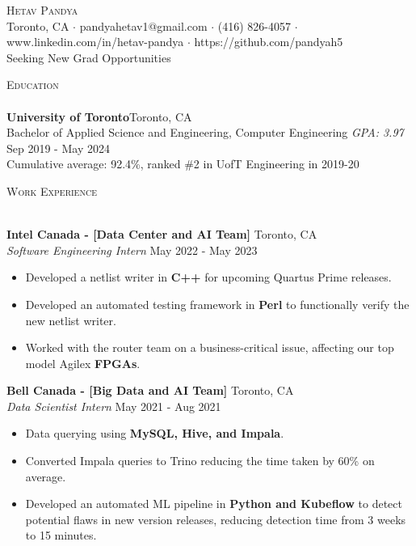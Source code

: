 \documentclass[a4paper]{article}
\newcommand{\lineunder} {
    \vspace*{-8pt} \\
    \hspace*{-18pt} \hrulefill \\
}
\newcommand{\header} [1] {
    {\hspace*{-18pt}\vspace*{6pt} \textsc{#1}}
    \vspace*{-6pt} \lineunder
}
\begin{document}
\vspace*{-40pt}



\vspace*{-10pt}
\begin{center}
	{\Huge \scshape {Hetav Pandya}}\\
	Toronto, CA $\cdot$ pandyahetav1@gmail.com $\cdot$ (416) 826-4057 $\cdot$ www.linkedin.com/in/hetav-pandya $\cdot$ https://github.com/pandyah5\\
    Seeking New Grad Opportunities
\end{center}

\header{Education}
\textbf{University of Toronto}\hfill Toronto, CA\\
Bachelor of Applied Science and Engineering, Computer Engineering \textit{GPA: 3.97} \hfill Sep 2019 - May 2024\\
Cumulative average: 92.4\%, ranked \#2 in UofT Engineering in 2019-20
\vspace{2mm}

\header{Work Experience}
\vspace{1mm}

\textbf{Intel Canada - [Data Center and AI Team]} \hfill Toronto, CA\\
\textit{Software Engineering Intern} \hfill May 2022 - May 2023\\
\vspace{-1mm}
\begin{itemize} \itemsep 1pt
	\item Developed a netlist writer in \textbf{C++} for upcoming Quartus Prime releases.
	\item Developed an automated testing framework in \textbf{Perl} to functionally verify the new netlist writer.
	\item Worked with the router team on a business-critical issue, affecting our top model Agilex \textbf{FPGAs}. 
\end{itemize}

\textbf{Bell Canada - [Big Data and AI Team]} \hfill Toronto, CA\\
\textit{Data Scientist Intern} \hfill May 2021 - Aug 2021\\
\vspace{-1mm}
\begin{itemize} \itemsep 1pt
	\item Data querying using \textbf{MySQL, Hive, and Impala}. 
	\item Converted Impala queries to Trino reducing the time taken by 60\% on average.
	\item Developed an automated ML pipeline in \textbf{Python and Kubeflow} to detect potential flaws in new version releases, reducing detection time from 3 weeks to 15 minutes.
\end{itemize}
\end{document}
